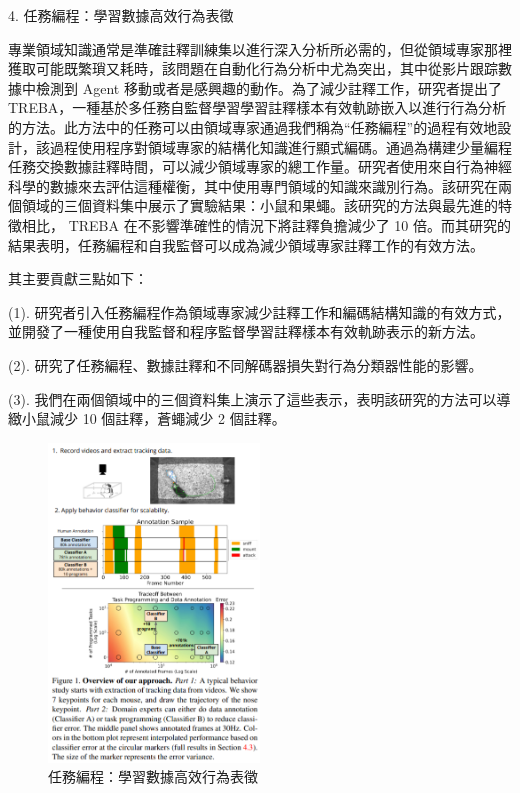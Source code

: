 \documentclass[10pt,UTF8]{ctexart}
\begin{document}
4. 任務編程：學習數據高效行為表徵

%

專業領域知識通常是準確註釋訓練集以進行深入分析所必需的，但從領域專家那裡獲取可能既繁瑣又耗時，該問題在自動化行為分析中尤為突出，其中從影片跟踪數據中檢測到 Agent 移動或者是感興趣的動作。為了減少註釋工作，研究者提出了 TREBA，一種基於多任務自監督學習學習註釋樣本有效軌跡嵌入以進行行為分析的方法。此方法中的任務可以由領域專家通過我們稱為“任務編程”的過程有效地設計，該過程使用程序對領域專家的結構化知識進行顯式編碼。通過為構建少量編程任務交換數據註釋時間，可以減少領域專家的總工作量。研究者使用來自行為神經科學的數據來去評估這種權衡，其中使用專門領域的知識來識別行為。該研究在兩個領域的三個資料集中展示了實驗結果：小鼠和果蠅。該研究的方法與最先進的特徵相比， TREBA 在不影響準確性的情況下將註釋負擔減少了 10 倍。而其研究的結果表明，任務編程和自我監督可以成為減少領域專家註釋工作的有效方法。

其主要貢獻三點如下：

(1). 研究者引入任務編程作為領域專家減少註釋工作和編碼結構知識的有效方式，並開發了一種使用自我監督和程序監督學習註釋樣本有效軌跡表示的新方法。

(2). 研究了任務編程、數據註釋和不同解碼器損失對行為分類器性能的影響。

(3). 我們在兩個領域中的三個資料集上演示了這些表示，表明該研究的方法可以導緻小鼠減少 10 個註釋，蒼蠅減少 2 個註釋。

\begin{figure}[H]
\centering 
\includegraphics[width=0.50\textwidth]{r4.png} 
\caption{任務編程：學習數據高效行為表徵}
\label{Test}
\end{figure}
\end{document}
